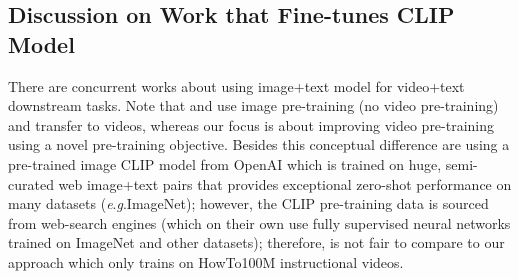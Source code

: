 \documentclass[11pt]{article}
\newcommand{\eg}{\textit{e}.\textit{g}.}
\begin{document}
\begin{table*}[!htbp]
\small
\centering
{}
\caption{Qualitative error analysis of \textit{textvideo retrieval} on Youcook2.
}
\label{tbl:err_youcook}
\end{table*}

\subsection{Discussion on Work that Fine-tunes CLIP Model}
There are concurrent works \cite{luo2021clip4clip,portillo2021straightforward} about using image+text model \cite{radford2021learning} for video+text downstream tasks.
Note that \cite{luo2021clip4clip} and \cite{portillo2021straightforward} use image pre-training (no video pre-training) and transfer to videos, whereas our focus is about improving video pre-training using a novel pre-training objective. 
Besides this conceptual difference
\cite{luo2021clip4clip,portillo2021straightforward} are using a pre-trained image CLIP\cite{radford2021learning} model from OpenAI which is trained on huge, semi-curated web image+text pairs that provides exceptional zero-shot performance on many datasets (\eg  ImageNet); however, the CLIP pre-training data is sourced from web-search engines (which on their own use fully supervised neural networks trained on ImageNet and other datasets); therefore, is not fair to compare to our approach which only trains on HowTo100M instructional videos.
\end{document}
